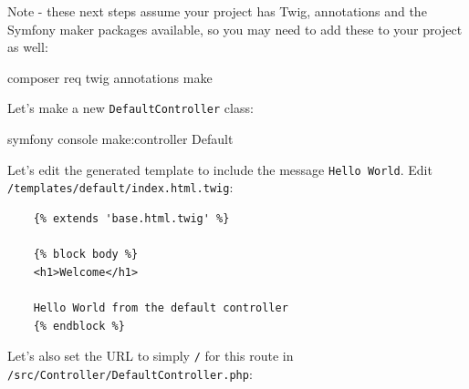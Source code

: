 \documentclass[a4paperpaper,openright]{book}
\newenvironment{Shaded}{}{}
\newcommand{\AnnotationTok}[1]{\textcolor[rgb]{0.38,0.63,0.69}{\textbf{\textit{#1}}}}
\newcommand{\CommentTok}[1]{\textcolor[rgb]{0.38,0.63,0.69}{\textit{#1}}}
\newcommand{\ExtensionTok}[1]{#1}
\newcommand{\KeywordTok}[1]{\textcolor[rgb]{0.00,0.44,0.13}{\textbf{#1}}}
\newcommand{\NormalTok}[1]{#1}
\newcommand{\OtherTok}[1]{\textcolor[rgb]{0.00,0.44,0.13}{#1}}
\newcommand{\StringTok}[1]{\textcolor[rgb]{0.25,0.44,0.63}{#1}}
\begin{document}
Note - these next steps assume your project has Twig, annotations and
the Symfony maker packages available, so you may need to add these to
your project as well:

\begin{Shaded}
\begin{Highlighting}[]
    \ExtensionTok{composer}\NormalTok{ req twig annotations make}
\end{Highlighting}
\end{Shaded}

Let's make a new \texttt{DefaultController} class:

\begin{Shaded}
\begin{Highlighting}[]
    \ExtensionTok{symfony}\NormalTok{ console make:controller Default}
\end{Highlighting}
\end{Shaded}

Let's edit the generated template to include the message
\texttt{Hello\ World}. Edit \texttt{/templates/default/index.html.twig}:

\begin{verbatim}
    {% extends 'base.html.twig' %}

    {% block body %}
    <h1>Welcome</h1>

    Hello World from the default controller
    {% endblock %}
\end{verbatim}

Let's also set the URL to simply \texttt{/} for this route in
\texttt{/src/Controller/DefaultController.php}:

\begin{Shaded}
\end{Shaded}
\end{document}
